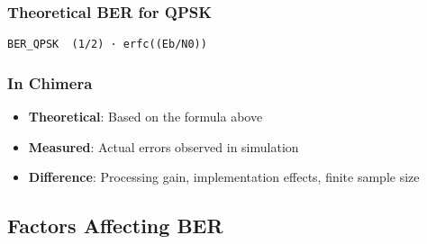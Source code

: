 \subsubsection{Theoretical BER for QPSK}\label{theoretical-ber-for-qpsk}

\begin{verbatim}
BER_QPSK  (1/2) · erfc((Eb/N0))
\end{verbatim}

\subsubsection{In Chimera}\label{in-chimera}

\begin{itemize}
\tightlist
\item
  \textbf{Theoretical}: Based on the formula above
\item
  \textbf{Measured}: Actual errors observed in simulation
\item
  \textbf{Difference}: Processing gain, implementation effects, finite
  sample size
\end{itemize}

\subsection{Factors Affecting BER}\label{factors-affecting-ber}

